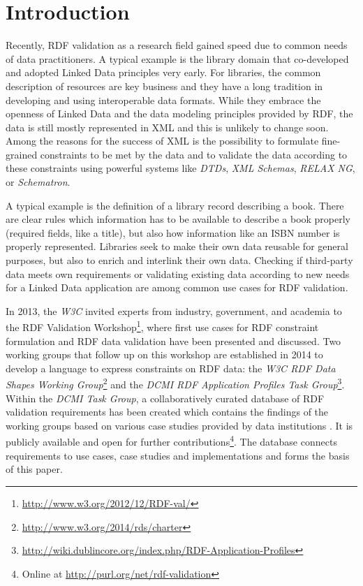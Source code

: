 \documentclass{acm_proc_article-sp}
\begin{document}
  

\section{Introduction}
\label{introduction}

Recently, RDF validation as a research field gained speed due to common needs of data practitioners. A typical example is the library domain that co-developed and adopted Linked Data principles very early. For libraries, the common description of resources are key business and they have a long tradition in developing and using interoperable data formats. While they embrace the openness of Linked Data and the data modeling principles provided by RDF, the data is still mostly represented in XML and this is unlikely to change soon. 
Among the reasons for the success of XML is the possibility to formulate fine-grained constraints to be met by the data and to validate the data according to these constraints using powerful systems like \emph{DTDs}, \emph{XML Schemas}, \emph{RELAX NG}, or \emph{Schematron}.

A typical example is the definition of a library record describing a book. There are clear rules which information has to be available to describe a book properly (required fields, like a title), but also how information like an ISBN number is properly represented. Libraries seek to make their own data reusable for general purposes, but also to enrich and interlink their own data. Checking if third-party data meets own requirements or validating existing data according to new needs for a Linked Data application are among common use cases for RDF validation.

In 2013, the \emph{W3C} invited experts from industry, government, and academia to the RDF Validation Workshop\footnote{\url{http://www.w3.org/2012/12/RDF-val/}}, 
where first use cases for RDF constraint formulation and RDF data validation have been presented and discussed. 
Two working groups that follow up on this workshop are established in 2014 to develop a language to express constraints on RDF data: 
the \emph{W3C RDF Data Shapes Working Group}\footnote{\url{http://www.w3.org/2014/rds/charter}} and the \emph{DCMI RDF Application Profiles Task Group}\footnote{\url{http://wiki.dublincore.org/index.php/RDF-Application-Profiles}}. 
Within the \emph{DCMI Task Group}, a collaboratively curated database of RDF validation requirements has been created which contains the findings of the working groups based on various case studies provided by data institutions \cite{BoschEckert2014}. It is publicly available and open for further contributions\footnote{Online at \url{http://purl.org/net/rdf-validation}}.
The database connects requirements to use cases, case studies and implementations and forms the basis of this paper. 
\end{document}
